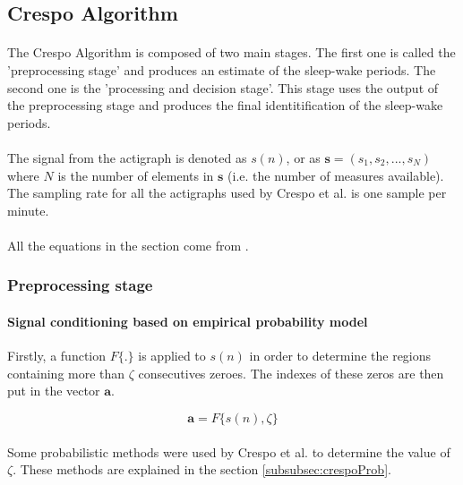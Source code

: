 \documentclass[a4paper,10pt]{article}
\begin{document}
\subsection{Crespo Algorithm}

\paragraph{}
The Crespo Algorithm\cite{Crespo2012} is composed of two main stages. The first one is called the 'preprocessing stage' and produces an estimate of the sleep-wake periods. The second one is the 'processing and decision stage'. This stage uses the output of the preprocessing stage and produces the final identitification of the sleep-wake periods.

\paragraph{}
The signal from the actigraph is denoted as $s(n)$, or as $\mathbf{s} = (s_1, s_2, ..., s_N)$ where $N$ is the number of elements in $\mathbf{s}$ (i.e. the number of measures available). The sampling rate for all the actigraphs used by Crespo et al. is one sample per minute.

\paragraph{}
All the equations in the section come from \cite{Crespo2012}.

\subsubsection{Preprocessing stage}
\label{subsubsec:preprocessing}
\paragraph{Signal conditioning based on empirical probability model\\}
Firstly, a function $F\{.\}$ is applied to $s(n)$ in order to determine the regions containing more than $\zeta$ consecutives zeroes. The indexes of these zeros are then put in the vector $\mathbf{a}$.

\begin{equation}
\mathbf{a} = F\{s(n), \zeta\}
\end{equation}

\paragraph{}
Some probabilistic methods were used by Crespo et al. to determine the value of $\zeta$. These methods are explained in the section \ref{subsubsec:crespoProb}.
\end{document}
